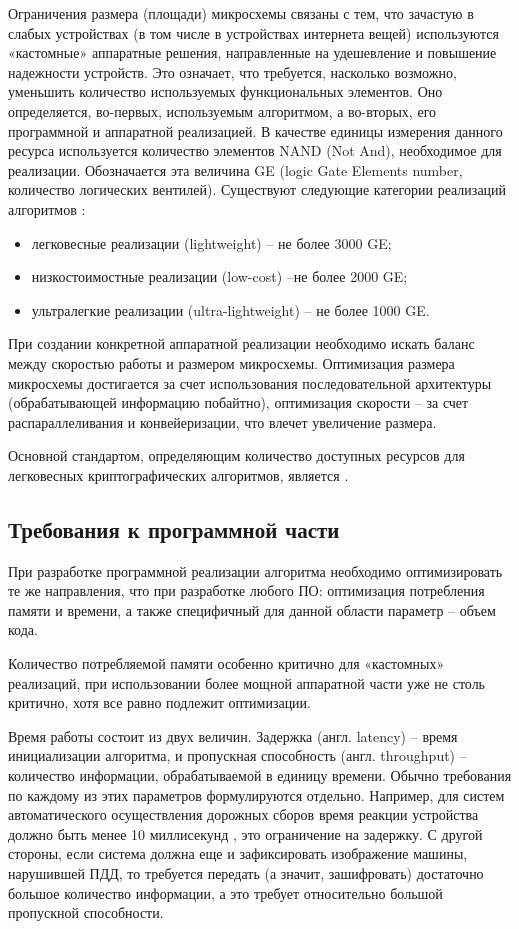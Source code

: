 Ограничения размера (площади) микросхемы связаны с тем, что зачастую в слабых устройствах (в том числе в устройствах интернета вещей) используются «кастомные» аппаратные решения, направленные на удешевление и повышение надежности устройств. Это означает, что требуется, насколько возможно, уменьшить количество используемых функциональных элементов. Оно определяется, во-первых, используемым алгоритмом, а во-вторых, его программной и аппаратной реализацией. В качестве единицы измерения данного ресурса используется количество элементов NAND (Not And), необходимое для реализации. Обозначается эта величина GE (logic Gate Elements number, количество логических вентилей). Существуют следующие категории реализаций алгоритмов \cite{src25}:
\begin{itemize}
	\item легковесные реализации (lightweight) – не более 3000 GE;
	\item низкостоимостные реализации (low-cost) –не более 2000 GE;
	\item ультралегкие реализации (ultra-lightweight) – не более 1000 GE.
\end{itemize}

При создании конкретной аппаратной реализации необходимо искать баланс между скоростью работы и размером микросхемы. Оптимизация размера микросхемы достигается за счет использования последовательной архитектуры (обрабатывающей информацию побайтно), оптимизация скорости – за счет распараллеливания и конвейеризации, что влечет увеличение размера.

Основной стандартом, определяющим количество доступных ресурсов для легковесных криптографических алгоритмов, является \cite{src26}.

\subsection{Требования к программной части} %

При разработке программной реализации алгоритма необходимо оптимизировать те же направления, что при разработке любого ПО: оптимизация потребления памяти и времени, а также специфичный для данной области параметр – объем кода.

Количество потребляемой памяти особенно критично для «кастомных» реализаций, при использовании более мощной аппаратной части уже не столь критично, хотя все равно подлежит оптимизации.

Время работы состоит из двух величин. Задержка (англ. latency) – время инициализации алгоритма, и пропускная способность (англ. throughput) – количество информации, обрабатываемой в единицу времени. Обычно требования по каждому из этих параметров формулируются отдельно. Например, для систем автоматического осуществления дорожных сборов время реакции устройства должно быть менее 10 миллисекунд \cite{src27}, это ограничение на задержку. С другой стороны, если система должна еще и зафиксировать изображение машины, нарушившей ПДД, то требуется передать (а значит, зашифровать) достаточно большое количество информации, а это требует относительно большой пропускной способности.

